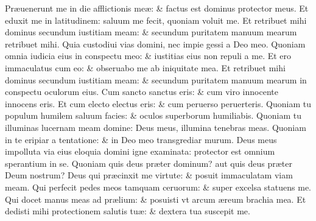 \documentclass[a5paper,10pt]{book}
\def\ae{æ}
\begin{document}
\begin{multicols*}{2}
\newline \color{red} P\color{black}r\ae uenerunt me in die afflictionis me\ae : \& factus est dominus protector meus.
\newline \color{red} E\color{black}t eduxit me in latitudinem: saluum me fecit, quoniam voluit me.
\newline \color{red} E\color{black}t retribuet mihi dominus secundum iustitiam meam: \& secundum puritatem manuum mearum retribuet mihi.
\newline \color{red} Q\color{black}uia custodiui vias domini, nec impie gessi a Deo meo.
\newline \color{red} Q\color{black}uoniam omnia iudicia eius in conspectu meo: \& iustitias eius non repuli a me.
\newline \color{red} E\color{black}t ero immaculatus cum eo: \& obseruabo me ab iniquitate mea.
\newline \color{red} E\color{black}t retribuet mihi dominus secundum iustitiam meam: \& secundum puritatem manuum mearum in conspectu oculorum eius.
\newline \color{red} C\color{black}um sancto sanctus eris: \& cum viro innocente innocens eris.
\newline \color{red} E\color{black}t cum electo electus eris: \& cum peruerso peruerteris.
\newline \color{red} Q\color{black}uoniam tu populum humilem saluum facies: \& oculos superborum humiliabis.
\newline \color{red} Q\color{black}uoniam tu illuminas lucernam meam domine: Deus meus, illumina tenebras meas.
\newline \color{red} Q\color{black}uoniam in te eripiar a tentatione: \& in Deo meo transgrediar murum.
\newline \color{red} D\color{black}eus meus impolluta via eius eloquia domini igne examinata: protector est omnium sperantium in se.
\newline \color{red} Q\color{black}uoniam quis deus pr\ae ter dominum? aut quis deus pr\ae ter Deum nostrum?
\newline \color{red} D\color{black}eus qui pr\ae cinxit me virtute: \& posuit immaculatam viam meam.
\newline \color{red} Q\color{black}ui perfecit pedes meos tamquam ceruorum: \& super excelsa statuens me.
\newline \color{red} Q\color{black}ui docet manus meas ad pr\ae lium: \& posuisti vt arcum \ae reum brachia mea.
\newline \color{red} E\color{black}t dedisti mihi protectionem salutis tu\ae : \& dextera tua suscepit me.

\end{multicols*}
\end{document}
